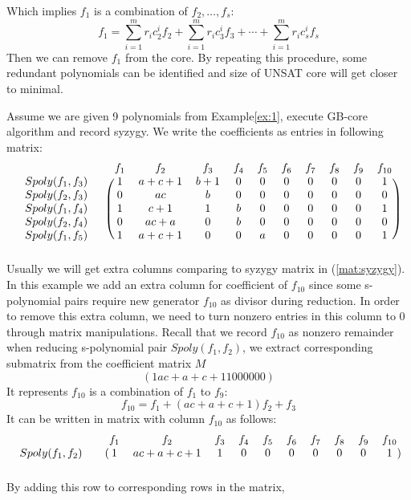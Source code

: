 Which implies $f_1$ is a combination of $f_2,\dots,f_s$:
 $$f_1 = \sum_{i=1}^m r_ic_2^if_2 + \sum_{i=1}^m r_ic_3^if_3
 +\cdots + \sum_{i=1}^m r_ic_s^if_s$$
 Then we can remove $f_1$ from the core. By repeating
 this procedure, some redundant polynomials can be identified
 and size of UNSAT core will get closer to minimal.
 \begin{example}
 Assume we are given 9 polynomials from Example\ref{ex:1},
 execute GB-core algorithm and record syzygy. We
 write the coefficients as entries in following matrix:
 \[
 \begin{blockarray}{cccccccccccc}
  && f_1 & f_2 & f_3 & f_4 & f_5 & f_6 & f_7 & f_8 & f_9 & f_{10} \\
  \begin{block}{cc(cccccccccc)}
  Spoly(f_1,f_3)\ & & 1 & a+c+1 & b+1 &0&0&0&0&0&0&1\\
  Spoly(f_2,f_3)\ & & 0 & ac & b &0&0&0&0&0&0&0\\
  Spoly(f_1,f_4)\ & & 1 & c+1 & 1 &b&0&0&0&0&0&1\\
  Spoly(f_2,f_4)\ & & 0 & ac+a & 0 &b&0&0&0&0&0&0\\
  Spoly(f_1,f_5)\ & & 1 & a+c+1 & 0 &0&a&0&0&0&0&1\\
  \end{block}
  \end{blockarray}
 \]
 Usually we will get extra columns comparing to syzygy matrix in (\ref{mat:syzygy}).
 In this example we add an extra column for coefficient of $f_{10}$
 since some s-polynomial pairs require new generator $f_{10}$
 as divisor during reduction. In order to remove this
 extra column, we need to turn nonzero entries in this column
 to 0 through matrix manipulations. Recall that
 we record $f_{10}$ as nonzero remainder when reducing s-polynomial
 pair $Spoly(f_1,f_2)$, we extract corresponding submatrix from the coefficient matrix $M$
 $$(1 ac+a+c+1 1 0 0 0 0 0 0 )$$
 It represents $f_{10}$ is a combination of $f_1$ to $f_9$:
 $$f_{10} = f_1 + (ac+a+c+1)f_2 + f_3$$
 It can be written in matrix with column $f_{10}$ as follows:
  \[
 \begin{blockarray}{cccccccccccc}
  && f_1 & f_2 & f_3 & f_4 & f_5 & f_6 & f_7 & f_8 & f_9 & f_{10} \\
  \begin{block}{cc(cccccccccc)}
  Spoly(f_1,f_2)& & 1 & ac+a+c+1 & 1 &0&0&0&0&0&0&1\\
  \end{block}
  \end{blockarray}
 \]
 By adding this row to corresponding rows in the matrix,

\end{example}
